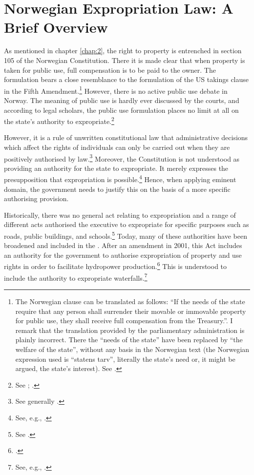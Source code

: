 \section{Norwegian Expropriation Law: A Brief Overview}\label{sec:5:2}

As mentioned in chapter \ref{chap:2}, the right to property is entrenched in section 105 of the Norwegian Constitution. There it is made clear that when property is taken for public use, full compensation is to be paid to the owner. The formulation bears a close resemblance to the formulation of the US takings clause in the Fifth Amendment.\footnote{The Norwegian clause can be translated as follows: ``If the needs of the state require that any person shall surrender their movable or immovable property for public use, they shall receive full compensation from the Treasury.''. I remark that the translation provided by the parliamentary administration is plainly  incorrect. There the ``needs of the state'' have been replaced by ``the welfare of the state'', without any basis in the Norwegian text (the Norwegian expression used is ``statens tarv'', literally the state's need or, it might be argued, the state's interest). See \cite{grunnlovsjuks}.} However, there is no active public use debate in Norway. The meaning of public use is hardly ever discussed by the courts, and according to legal scholars, the public use formulation places no limit at all on the state's authority to expropriate.\footnote{See \cite[249]{aall04}; \cite{sauda09}.}

However, it is a rule of unwritten constitutional law that administrative decisions which affect the rights of individuals can only be carried out when they are positively authorised by law.\footnote{See generally \cite{hogberg11}.} Moreover, the Constitution is not understood as providing an authority for the state to expropriate. It merely expresses the presupposition that expropriation is possible.\footnote{See, e.g., \cite[6]{fleischer86}.} Hence, when applying eminent domain, the government needs to justify this on the basis of a more specific authorising provision. 

Historically, there was no general act relating to expropriation and a range of different acts authorised the executive to expropriate for specific purposes such as roads, public buildings, and schools.\footnote{See \cite[11-12]{nut54}.} Today, many of these authorities have been broadened and included in the \cite{ea59}. After an amendment in 2001, this Act includes an authority for the government to authorise expropriation of property and use rights in order to facilitate hydropower production.\dni\footcite[2 no 51]{ea59} This is understood to include the authority to expropriate waterfalls.\footnote{See, e.g., 
\cite{sauda07}.}

